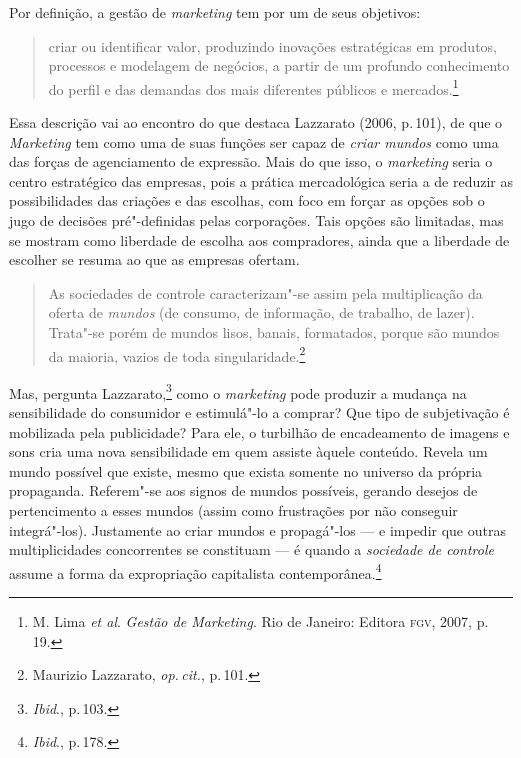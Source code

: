 Por definição, a gestão de \textit{marketing} tem por um de seus
objetivos:

\begin{quote}
criar ou identificar valor, produzindo inovações estratégicas em
produtos, processos e modelagem de negócios, a partir de um profundo
conhecimento do perfil e das demandas dos mais diferentes públicos e
mercados.\footnote{M. Lima \textit{et al}. \textit{Gestão de Marketing}. Rio de Janeiro: Editora
\textsc{fgv}, 2007, p.\,19.}
\end{quote}

Essa descrição vai ao encontro do que destaca Lazzarato (2006, p.\,101),
de que o \textit{Marketing} tem como uma de suas funções ser capaz de
\textit{criar mundos} como uma das forças de agenciamento de expressão.
Mais do que isso, o \textit{marketing} seria o centro estratégico das
empresas, pois a prática mercadológica seria a de reduzir as
possibilidades das criações e das escolhas, com foco em forçar as opções
sob o jugo de decisões pré"-definidas pelas corporações. Tais opções são
limitadas, mas se mostram como liberdade de escolha aos compradores, ainda que
a liberdade de escolher se resuma ao que as empresas ofertam.

\begin{quote}
As sociedades de controle caracterizam"-se assim pela multiplicação da
oferta de \textit{mundos} (de consumo, de informação, de trabalho, de lazer).
Trata"-se porém de mundos lisos, banais, formatados, porque são mundos da
maioria, vazios de toda singularidade.\footnote{Maurizio Lazzarato, \textit{op.\,cit.}, p.\,101.}
\end{quote}

Mas, pergunta Lazzarato,\footnote{\textit{Ibid}., p.\,103.} como o \textit{marketing} pode
produzir a mudança na sensibilidade do consumidor e estimulá"-lo a
comprar? Que tipo de subjetivação é mobilizada pela publicidade? Para
ele, o turbilhão de encadeamento de imagens e sons cria uma nova
sensibilidade em quem assiste àquele conteúdo. Revela um mundo possível
que existe, mesmo que exista somente no universo da própria propaganda.
Referem"-se aos signos de mundos possíveis, gerando desejos de
pertencimento a esses mundos (assim como frustrações por não conseguir
integrá"-los). Justamente ao criar mundos e propagá"-los --- e impedir que
outras multiplicidades concorrentes se constituam --- é quando a
\textit{sociedade de controle} assume a forma da expropriação capitalista
contemporânea.\footnote{\textit{Ibid}., p.\,178.}

